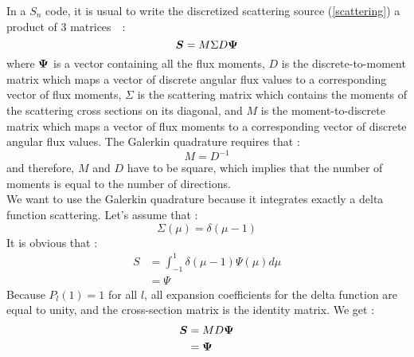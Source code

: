 In a $S_n$ code, it is usual to write the discretized scattering source 
(\ref{scattering}) a product of 3 \hbox{matrices \cite{graal} :}
\begin{equation}
\boldsymbol{S} = M \Sigma D \boldsymbol{\Psi}
\end{equation}
where $\boldsymbol{\Psi}$ is a vector containing all the flux moments, $D$ is the
discrete-to-moment matrix which maps a vector of discrete angular flux values
to a corresponding vector of flux moments, $\Sigma$ is the scattering matrix
which contains the moments of the scattering cross sections on its diagonal, and 
$M$ is the moment-to-discrete matrix which maps a vector of flux moments to a 
corresponding vector of discrete angular flux values. The Galerkin quadrature 
requires that :
\begin{equation}
M = D^{-1}
\end{equation}
and therefore, $M$ and $D$ have to be square, which implies that the number of
moments is equal to the number of directions.\\
We want to use the Galerkin quadrature because it integrates exactly a delta
function scattering. Let's assume that :
\begin{equation}
\Sigma(\mu) = \delta(\mu-1)
\end{equation}
It is obvious that :
\begin{equation}
\begin{split}
S &= \int_{-1}^1 \delta(\mu-1) \Psi(\mu) d\mu\\
&= \Psi
\end{split}
\end{equation}
Because $P_l(1)=1$ for all $l$, all expansion coefficients for the delta
function are equal to unity, and the cross-section matrix is the identity
matrix. We get :
\begin{equation}
\begin{split}
\boldsymbol{S} &= MD\boldsymbol{\Psi}\\
&= \boldsymbol{\Psi}\\
\end{split}
\end{equation}

